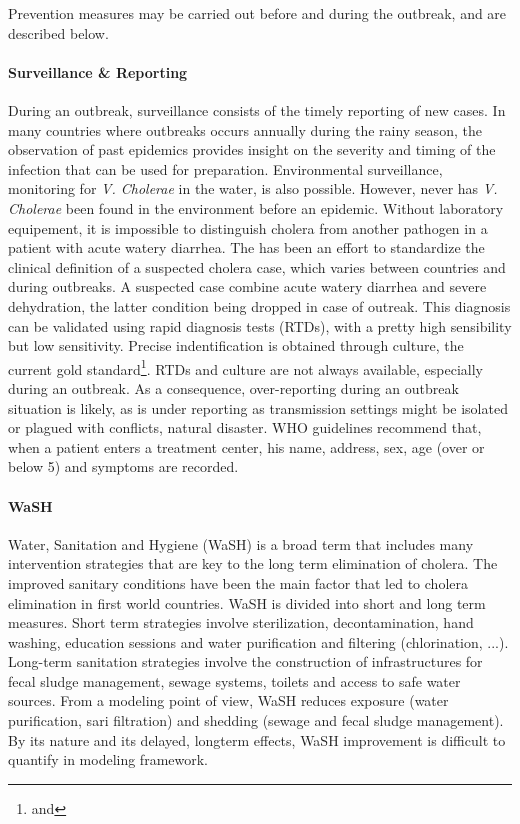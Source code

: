 Prevention measures may be carried out before and during the outbreak, and are described below.

\paragraph{Surveillance \& Reporting} During an outbreak, surveillance consists of the timely reporting of new cases. In many countries where outbreaks occurs annually during the rainy season, the observation of past epidemics provides insight on the severity and timing of the infection that can be used for preparation\cite{Baracchini:SeasonalityCholeraDynamics:2017}. Environmental surveillance, monitoring for \textit{V. Cholerae} in the water, is also possible. However, never has \textit{V. Cholerae} been found in the environment before an epidemic. 
Without laboratory equipement, it is impossible to distinguish cholera from another pathogen in a patient with acute watery diarrhea. The has been an effort to standardize the clinical definition of a suspected cholera case, which varies between countries and during outbreaks. A suspected case combine acute watery diarrhea and severe dehydration, the latter condition being dropped in case of outreak. This diagnosis can be validated using rapid diagnosis tests (RTDs), with a pretty high sensibility but low sensitivity. Precise indentification is obtained through culture, the current gold standard\footnote{ and }. RTDs and culture are not always available, especially during an outbreak.  As a consequence, over-reporting during an outbreak situation is likely, as is under reporting as transmission settings might be isolated or plagued with conflicts, natural disaster. WHO guidelines recommend that, when a patient enters a treatment center, his name, address, sex, age (over or below 5) and symptoms are recorded\cite{WHO:FirstStepsManaging:2010}. %

\paragraph{WaSH} Water, Sanitation and Hygiene (WaSH) is a broad term that includes many intervention strategies that are key to the long term elimination of cholera. The improved sanitary conditions have been the main factor that led to cholera elimination  in first world countries. WaSH is divided into short and long term measures. Short term strategies involve sterilization, decontamination, hand washing, education sessions and water purification and filtering (chlorination, ...)\cite{Rebaudet:NationalAlertresponseStrategy:2018,Fewtrell:WaterSanitationHygiene:2005}. Long-term sanitation strategies involve the construction of infrastructures for fecal sludge management, sewage systems, toilets and access to safe water sources. From a modeling point of view, WaSH reduces exposure (water purification, sari filtration) and shedding (sewage and fecal sludge management). By its nature and its delayed, longterm effects, WaSH improvement is difficult to quantify in modeling framework.

